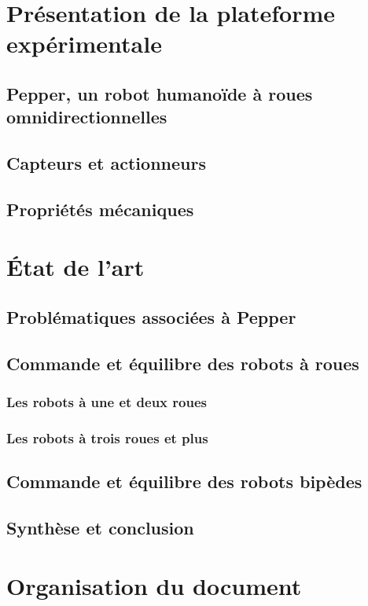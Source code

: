 \section{Présentation de la plateforme expérimentale}
	\subsection{Pepper, un robot humanoïde à roues omnidirectionnelles}
	\subsection{Capteurs et actionneurs}
	\subsection{Propriétés mécaniques}	
\section{État de l'art}
	\subsection{Problématiques associées à Pepper}
	\subsection{Commande et équilibre des robots à roues}
		\subsubsection{Les robots à une et deux roues}
		\subsubsection{Les robots à trois roues et plus}
	\subsection{Commande et équilibre des robots bipèdes}
	\subsection{Synthèse et conclusion}
\section{Organisation du document}